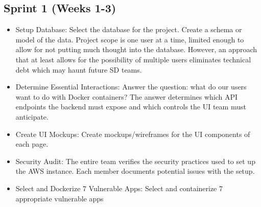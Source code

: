 \documentclass[12pt]{article}
\begin{document}
\subsection{Sprint 1 (Weeks 1-3)}
\begin{itemize}
	\item Setup Database: 
	Select the database for the project. Create a schema or model of the data. Project scope is one user at a time, limited enough to allow for not putting much thought into the database. However, an approach that at least allows for the possibility of multiple users eliminates technical debt which may haunt future SD teams.
	\item Determine Essential Interactions:
	Answer the question: what do our users want to do with Docker containers? The answer determines which API endpoints the backend must expose and which controls the UI team must anticipate.
	\item Create UI Mockups:
	Create mockups/wireframes for the UI components of each page.
	\item Security Audit:
	The entire team verifies the security practices used to set up the AWS instance. Each member documents potential issues with the setup.
	\item Select and Dockerize 7 Vulnerable Apps:
	Select and containerize 7 appropriate vulnerable apps
\end{itemize}
\end{document}
